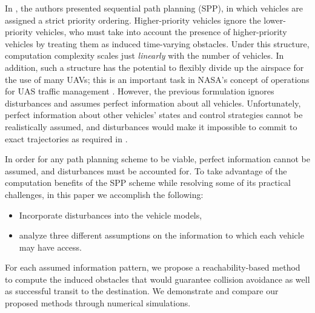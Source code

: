 In \cite{Chen15}, the authors presented sequential path planning (SPP), in which vehicles are assigned a strict priority ordering. Higher-priority vehicles ignore the lower-priority vehicles, who must take into account the presence of higher-priority vehicles by treating them as induced time-varying obstacles. Under this structure, computation complexity scales just \textit{linearly} with the number of vehicles. In addition, such a structure has the potential to flexibly divide up the airspace for the use of many UAVs; this is an important task in NASA's concept of operations for UAS traffic management \cite{Kopardekar16}. However, the previous formulation ignores disturbances and assumes perfect information about all vehicles. Unfortunately, perfect information about other vehicles' states and control strategies cannot be realistically assumed, and disturbances would make it impossible to commit to exact trajectories as required in \cite{Chen15}.

In order for any path planning scheme to be viable, perfect information cannot be assumed, and disturbances must be accounted for. To take advantage of the computation benefits of the SPP scheme while resolving some of its practical challenges, in this paper we accomplish the following:

\begin{itemize}
\item Incorporate disturbances into the vehicle models,
\item analyze three different assumptions on the information to which each vehicle may have access.
\end{itemize}

For each assumed information pattern, we propose a reachability-based method to compute the induced obstacles that would guarantee collision avoidance as well as successful transit to the destination. We demonstrate and compare our proposed methods through numerical simulations.